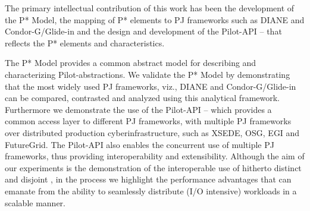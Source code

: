\documentclass[conference]{IEEEtran}
\begin{document}



The primary intellectual contribution of this work has been the
development of the P* Model, the mapping of P* elements to PJ
frameworks such as DIANE and Condor-G/Glide-in and the design and
development of the Pilot-API -- that reflects the P* elements and
characteristics.  
 
The P* Model provides a common abstract model for describing and
characterizing Pilot-abstractions.  We validate the P* Model by
demonstrating that the most widely used PJ frameworks, viz., DIANE and
Condor-G/Glide-in can be compared, contrasted and analyzed using this
analytical framework.  Furthermore we demonstrate the use of the
Pilot-API -- which provides a common access layer to different PJ
frameworks, with multiple PJ frameworks over distributed production
cyberinfrastructure, such as XSEDE, OSG, EGI and FutureGrid. The
Pilot-API also enables the concurrent use of multiple PJ frameworks,
thus providing interoperability and extensibility.  Although the aim
of our experiments is the demonstration of the interoperable use of
hitherto distinct and disjoint \pilotjobs, in the process we highlight
the performance advantages that can emanate from the ability to
seamlessly distribute (I/O intensive) workloads in a scalable manner.




\end{document}
